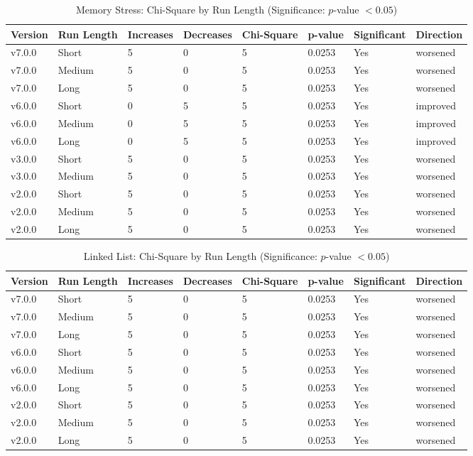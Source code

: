 \begin{table}[H]\caption{Memory Stress: Chi-Square by Run Length (Significance: $p$-value $<0.05$)}
\centering\footnotesize\setlength{\tabcolsep}{4pt}\renewcommand{\arraystretch}{1.15}
\begin{tabular}{llllllll}
\toprule
Version & Run Length & Increases & Decreases & Chi-Square & p-value & Significant & Direction \\ \midrule
v7.0.0 & Short & 5 & 0 & 5 & 0.0253 & Yes & worsened \\
v7.0.0 & Medium & 5 & 0 & 5 & 0.0253 & Yes & worsened \\
v7.0.0 & Long & 5 & 0 & 5 & 0.0253 & Yes & worsened \\
v6.0.0 & Short & 0 & 5 & 5 & 0.0253 & Yes & improved \\
v6.0.0 & Medium & 0 & 5 & 5 & 0.0253 & Yes & improved \\
v6.0.0 & Long & 0 & 5 & 5 & 0.0253 & Yes & improved \\
v3.0.0 & Short & 5 & 0 & 5 & 0.0253 & Yes & worsened \\
v3.0.0 & Medium & 5 & 0 & 5 & 0.0253 & Yes & worsened \\
v2.0.0 & Short & 5 & 0 & 5 & 0.0253 & Yes & worsened \\
v2.0.0 & Medium & 5 & 0 & 5 & 0.0253 & Yes & worsened \\
v2.0.0 & Long & 5 & 0 & 5 & 0.0253 & Yes & worsened \\
\bottomrule\end{tabular}
\label{ChiMemoryStress}
\par\smallskip\parbox{0.95\textwidth}{\scriptsize}
\end{table}

\begin{table}[H]\caption{Linked List: Chi-Square by Run Length (Significance: $p$-value $<0.05$)}
\centering\footnotesize\setlength{\tabcolsep}{4pt}\renewcommand{\arraystretch}{1.15}
\begin{tabular}{llllllll}
\toprule
Version & Run Length & Increases & Decreases & Chi-Square & p-value & Significant & Direction \\ \midrule
v7.0.0 & Short & 5 & 0 & 5 & 0.0253 & Yes & worsened \\
v7.0.0 & Medium & 5 & 0 & 5 & 0.0253 & Yes & worsened \\
v7.0.0 & Long & 5 & 0 & 5 & 0.0253 & Yes & worsened \\
v6.0.0 & Short & 5 & 0 & 5 & 0.0253 & Yes & worsened \\
v6.0.0 & Medium & 5 & 0 & 5 & 0.0253 & Yes & worsened \\
v6.0.0 & Long & 5 & 0 & 5 & 0.0253 & Yes & worsened \\
v2.0.0 & Short & 5 & 0 & 5 & 0.0253 & Yes & worsened \\
v2.0.0 & Medium & 5 & 0 & 5 & 0.0253 & Yes & worsened \\
v2.0.0 & Long & 5 & 0 & 5 & 0.0253 & Yes & worsened \\
\bottomrule\end{tabular}
\label{ChiLinkedList}
\par\smallskip\parbox{0.95\textwidth}{\scriptsize}
\end{table}




